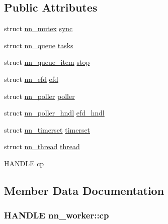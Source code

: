 \subsection*{Public Attributes}
\begin{DoxyCompactItemize}
\item 
struct \hyperlink{structnn__mutex}{nn\+\_\+mutex} \hyperlink{structnn__worker_a3ba45d381df6a5c98db85c69d1387673}{sync}
\item 
struct \hyperlink{structnn__queue}{nn\+\_\+queue} \hyperlink{structnn__worker_af14d85b3fd5398186d17b61e4afcc9c3}{tasks}
\item 
struct \hyperlink{structnn__queue__item}{nn\+\_\+queue\+\_\+item} \hyperlink{structnn__worker_acecc291f2b728c891694c701eb3081f1}{stop}
\item 
struct \hyperlink{structnn__efd}{nn\+\_\+efd} \hyperlink{structnn__worker_a45741cf3ce9c128308d7c5cf63aa78bb}{efd}
\item 
struct \hyperlink{structnn__poller}{nn\+\_\+poller} \hyperlink{structnn__worker_abb9794063c6c291431f5c851a6d88fae}{poller}
\item 
struct \hyperlink{structnn__poller__hndl}{nn\+\_\+poller\+\_\+hndl} \hyperlink{structnn__worker_a8898fc782028ff218b06374d8852327f}{efd\+\_\+hndl}
\item 
struct \hyperlink{structnn__timerset}{nn\+\_\+timerset} \hyperlink{structnn__worker_ad1a767bfefc0f42c2e3344d0e7b4dcf2}{timerset}
\item 
struct \hyperlink{structnn__thread}{nn\+\_\+thread} \hyperlink{structnn__worker_a3c0975d10f04acfecca6058b515be8bd}{thread}
\item 
H\+A\+N\+D\+LE \hyperlink{structnn__worker_a41ee78181275f5bddce3dfb754937c0c}{cp}
\end{DoxyCompactItemize}


\subsection{Member Data Documentation}
\subsubsection[{cp}]{\setlength{\rightskip}{0pt plus 5cm}H\+A\+N\+D\+LE nn\+\_\+worker\+::cp}\hypertarget{structnn__worker_a41ee78181275f5bddce3dfb754937c0c}{}\label{structnn__worker_a41ee78181275f5bddce3dfb754937c0c}
